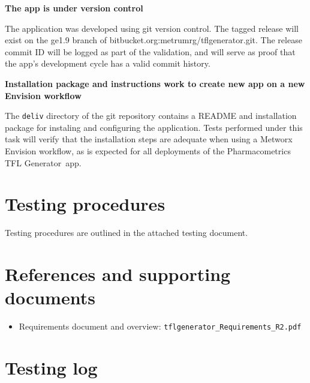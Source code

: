 \documentclass{article}
\newcommand{\tfl}{Pharmacometrics TFL Generator}
\newcommand{\testinglog}{deployment-testing-log.pdf}
\begin{document}
{\bf The app is under version control}

The application was developed using git version control.  The tagged release will exist on the ge1.9 branch of bitbucket.org:metrumrg/tflgenerator.git.  The release commit ID will be logged as part of the validation, and will serve as proof that the app's development cycle has a valid commit history.

{\bf Installation package and instructions work to create new app on a new Envision workflow}

The \verb=deliv= directory of the git repository contains a README and installation package for instaling and configuring the application. Tests performed under this task will verify that the installation steps are adequate when using a Metworx Envision workflow, as is expected for all deployments of the \tfl\ app.

\section*{Testing procedures}

Testing procedures are outlined in the attached testing document.


\section*{References and supporting documents}

\begin{itemize}
 \item Requirements document and overview: \verb=tflgenerator_Requirements_R2.pdf=
\end{itemize}

\section*{Testing log}


\end{document}
